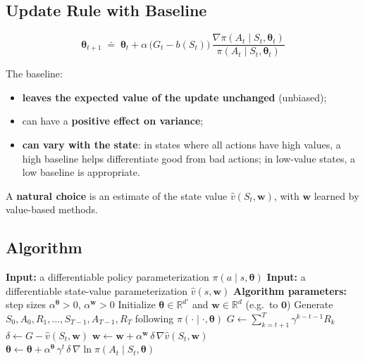 \documentclass[11pt,a4paper]{article}
\theoremstyle{definition}
\theoremstyle{plain}
\theoremstyle{remark}
\begin{document}
\subsection{Update Rule with Baseline}

\[
    \boxed{\;\boldsymbol{\theta}_{t+1} \;\doteq\; \boldsymbol{\theta}_t + \alpha\, \bigl(G_t - b(S_t)\bigr)\, \frac{\nabla \pi(A_t \mid S_t, \boldsymbol{\theta}_t)}{\pi(A_t \mid S_t, \boldsymbol{\theta}_t)}\;}
\]

The baseline:
\begin{itemize}
    \item \textbf{leaves the expected value of the update unchanged} (unbiased);
    \item can have a \textbf{positive effect on variance};
    \item \textbf{can vary with the state}: in states where all actions have high values, a high baseline helps differentiate good from bad actions; in low-value states, a low baseline is appropriate.
\end{itemize}

A \textbf{natural choice} is an estimate of the state value $\hat{v}(S_t, \mathbf{w})$, with $\mathbf{w}$ learned by value-based methods.

\subsection{Algorithm}

\begin{algorithm}[H]
\caption{REINFORCE with Baseline (episodic), for estimating $\pi_{\boldsymbol{\theta}} \approx \pi_*$}
\begin{algorithmic}
\STATE \textbf{Input:} a differentiable policy parameterization $\pi(a \mid s, \boldsymbol{\theta})$
\STATE \textbf{Input:} a differentiable state-value parameterization $\hat{v}(s, \mathbf{w})$
\STATE \textbf{Algorithm parameters:} step sizes $\alpha^{\boldsymbol{\theta}} > 0$, $\alpha^{\mathbf{w}} > 0$
\STATE Initialize $\boldsymbol{\theta} \in \mathbb{R}^{d'}$ and $\mathbf{w} \in \mathbb{R}^d$ (e.g.\ to $\mathbf{0}$)
    \STATE Generate $S_0, A_0, R_1, \ldots, S_{T-1}, A_{T-1}, R_T$ following $\pi(\cdot \mid \cdot, \boldsymbol{\theta})$
        \STATE $G \leftarrow \sum_{k=t+1}^{T} \gamma^{k-t-1} R_k$
        \STATE $\delta \leftarrow G - \hat{v}(S_t, \mathbf{w})$
        \STATE $\mathbf{w} \leftarrow \mathbf{w} + \alpha^{\mathbf{w}}\, \delta\, \nabla \hat{v}(S_t, \mathbf{w})$
        \STATE $\boldsymbol{\theta} \leftarrow \boldsymbol{\theta} + \alpha^{\boldsymbol{\theta}}\, \gamma^t\, \delta\, \nabla \ln \pi(A_t \mid S_t, \boldsymbol{\theta})$
    \ENDFOR
\ENDFOR
\end{algorithmic}
\end{algorithm}
\end{document}
